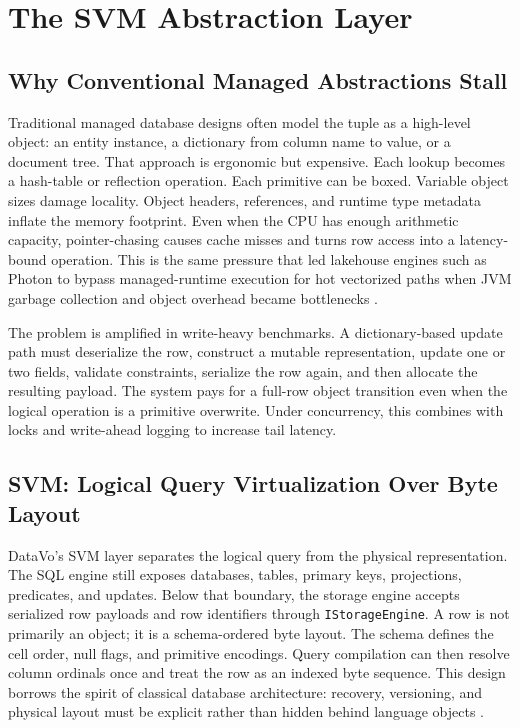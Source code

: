\documentclass[11pt]{article}
\begin{document}
\section{The SVM Abstraction Layer}
\subsection{Why Conventional Managed Abstractions Stall}
Traditional managed database designs often model the tuple as a high-level object: an entity instance, a dictionary from column name to value, or a document tree. That approach is ergonomic but expensive. Each lookup becomes a hash-table or reflection operation. Each primitive can be boxed. Variable object sizes damage locality. Object headers, references, and runtime type metadata inflate the memory footprint. Even when the CPU has enough arithmetic capacity, pointer-chasing causes cache misses and turns row access into a latency-bound operation. This is the same pressure that led lakehouse engines such as Photon to bypass managed-runtime execution for hot vectorized paths when JVM garbage collection and object overhead became bottlenecks \cite{photon}.

The problem is amplified in write-heavy benchmarks. A dictionary-based update path must deserialize the row, construct a mutable representation, update one or two fields, validate constraints, serialize the row again, and then allocate the resulting payload. The system pays for a full-row object transition even when the logical operation is a primitive overwrite. Under concurrency, this combines with locks and write-ahead logging to increase tail latency.

\subsection{SVM: Logical Query Virtualization Over Byte Layout}
DataVo's SVM layer separates the logical query from the physical representation. The SQL engine still exposes databases, tables, primary keys, projections, predicates, and updates. Below that boundary, the storage engine accepts serialized row payloads and row identifiers through \texttt{IStorageEngine}. A row is not primarily an object; it is a schema-ordered byte layout. The schema defines the cell order, null flags, and primitive encodings. Query compilation can then resolve column ordinals once and treat the row as an indexed byte sequence. This design borrows the spirit of classical database architecture: recovery, versioning, and physical layout must be explicit rather than hidden behind language objects \cite{aries,mvcc}.
\end{document}
